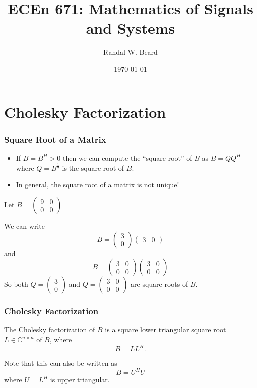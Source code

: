 \documentclass{beamer}
\title{ECEn 671: Mathematics of Signals and Systems}
\author{Randal W. Beard}
\institute{Brigham Young University}
\date{\today}
\begin{document}
\begin{frame}
	\titlepage
\end{frame}

\section{Cholesky Factorization}
\frame{\sectionpage}

\begin{frame}\frametitle{Square Root of a Matrix}
	\begin{itemize}
		\item If $B = B^H > 0$ then we can compute the ``square root'' of $B$ as $B = QQ^H$ where $Q = B^{\frac{1}{2}}$ is the square root of $B$.
		\item In general, the square root of a matrix is not unique!
	\end{itemize}
	\begin{example}
		Let $B = 
		\begin{pmatrix}
			9 & 0\\
			0 & 0
		\end{pmatrix}$
	
	
		We can write
		\[ 
			B = \begin{pmatrix} 3 \\ 0 \end{pmatrix}\begin{pmatrix} 3 & 0 \end{pmatrix} 
		\]
		and
		\[ 
			B = \begin{pmatrix}
					3 & 0\\
					0 & 0
				\end{pmatrix}
				\begin{pmatrix}
					3 & 0\\
					0 & 0
				\end{pmatrix}
		\]
		So both $Q = \begin{pmatrix} 3 \\ 0 \end{pmatrix}$ and $Q = \begin{pmatrix}
			3 & 0\\
			0 & 0
		\end{pmatrix}$ are square roots of $B$.
	\end{example}
\end{frame}

\begin{frame}\frametitle{Cholesky Factorization}

	\begin{definition}
	The \underline{Cholesky factorization} of $B$ is a square lower triangular square root $L \in \mathbb{C}^{n \times n}$ of $B$, where 
	\[ B = LL^H. \] 
	\end{definition}

	\vfill
	
	Note that this can also be written as
	\[ B=U^HU \]
	where $U=L^H$ is upper triangular.
\end{frame}
\end{document}
